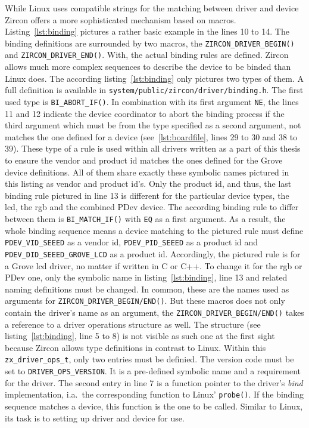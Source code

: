 While Linux uses compatible strings for the matching between driver and device Zircon offers a more sophisticated mechanism based on macros.
Listing~\ref{lst:binding} pictures a rather basic example in the lines 10 to 14.
The binding definitions are surrounded by two macros, the \texttt{ZIRCON_DRIVER_BEGIN()} and \texttt{ZIRCON_DRIVER_END()}.
With, the actual binding rules are defined.
Zircon allows much more complex sequences to describe the device to be binded than Linux does.
The according listing~\ref{lst:binding} only pictures two types of them.
A full definition is available in \texttt{system/public/zircon/driver/binding.h}.
The first used type is \texttt{BI_ABORT_IF()}.
In combination with its first argument \texttt{NE}, the lines 11 and 12 indicate the device coordinator to abort the binding process if the third argument which must be from the type specified as a second argument, not matches the one defined for a device (see~\ref{lst:boardfile}, lines 29 to 30 and 38 to 39).
These type of a rule is used within all drivers written as a part of this thesis to ensure the vendor and product id matches the ones defined for the Grove device definitions.
All of them share exactly these symbolic names pictured in this listing as vendor and product id's.
Only the product id, and thus, the last binding rule pictured in line 13 is different for the particular device types, the \ac{lcd}, the \ac{rgb} and the combined PDev device.
The according binding rule to differ between them is \texttt{BI_MATCH_IF()} with \texttt{EQ} as a first argument.
As a result, the whole binding sequence means a device matching to the pictured rule must define \texttt{PDEV\_VID\_SEEED} as a vendor id, \texttt{PDEV\_PID\_SEEED} as a product id and \texttt{PDEV\_DID\_SEEED\_GROVE\_LCD} as a product id.
Accordingly, the pictured rule is for a Grove \ac{lcd} driver, no matter if written in C or C++.
To change it for the \ac{rgb} or PDev one, only the symbolic name in listing~\ref{lst:binding}, line 13 and related naming definitions must be changed.
In common, these are the names used as arguments for \texttt{ZIRCON_DRIVER_BEGIN/END()}.
But these macros does not only contain the driver's name as an argument, the \texttt{ZIRCON_DRIVER_BEGIN/END()} takes a reference to a driver operations structure as well.
The structure (see listing~\ref{lst:binding}, line 5 to 8) is not visible as such one at the first sight because Zircon allows type definitions in contrast to Linux.
Within this \texttt{zx_driver_ops_t}, only two entries must be definied.
The version code must be set to \texttt{DRIVER_OPS_VERSION}.
It is a pre-defined symbolic name and a requirement for the driver.
The second entry in line 7 is a function pointer to the driver's \textit{bind} implementation, i.a.\ the corresponding function to Linux' \texttt{probe()}.
If the binding sequence matches a device, this function is the one to be called.
Similar to Linux, its task is to setting up driver and device for use.

